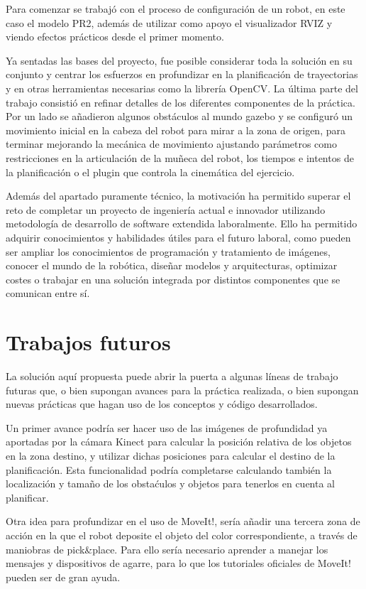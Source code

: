 \documentclass[12pt,spanish,chapterprefix, numbers=noenddot]{book}
\numberwithin{equation}{section}
\numberwithin{figure}{section}
\begin{document}
Para comenzar se trabajó con el proceso de configuración de un robot, en este caso el modelo PR2, además de utilizar como apoyo el visualizador RVIZ y viendo efectos prácticos desde el primer momento.

Ya sentadas las bases del proyecto, fue posible considerar toda la solución en su conjunto y centrar los esfuerzos en profundizar en la planificación de trayectorias y en otras herramientas necesarias como la librería OpenCV. La última parte del trabajo consistió en refinar detalles de los diferentes componentes de la práctica. Por un lado se añadieron algunos obstáculos al mundo gazebo y se configuró un movimiento inicial en la cabeza del robot para mirar a la zona de origen, para terminar mejorando la mecánica de movimiento ajustando parámetros como restricciones en la articulación de la muñeca del robot, los tiempos e intentos de la planificación o el plugin que controla la cinemática del ejercicio.

Además del apartado puramente técnico, la motivación ha permitido superar el reto de completar un proyecto de ingeniería actual e innovador utilizando metodología de desarrollo de software extendida laboralmente. Ello ha permitido adquirir conocimientos y habilidades útiles para el futuro laboral, como pueden ser ampliar los conocimientos de programación y tratamiento de imágenes, conocer el mundo de la robótica, diseñar modelos y arquitecturas, optimizar costes o trabajar en una solución integrada por distintos componentes que se comunican entre sí.  

\section{Trabajos futuros}

La solución aquí propuesta puede abrir la puerta a algunas líneas de trabajo futuras que, o bien supongan avances para la práctica realizada, o bien supongan nuevas prácticas que hagan uso de los conceptos y código desarrollados. 

Un primer avance podría ser hacer uso de las imágenes de profundidad ya aportadas por la cámara Kinect para calcular la posición relativa de los objetos en la zona destino, y utilizar dichas posiciones para calcular el destino de la planificación. Esta funcionalidad podría completarse calculando también la localización y tamaño de los obstaćulos y objetos para tenerlos en cuenta al planificar. 

Otra idea para profundizar en el uso de MoveIt!, sería añadir una tercera zona de acción en la que el robot deposite el objeto del color correspondiente, a través de maniobras de pick\&place. Para ello sería necesario aprender a manejar los mensajes y dispositivos de agarre, para lo que los tutoriales oficiales de MoveIt! pueden ser de gran ayuda.
\end{document}
